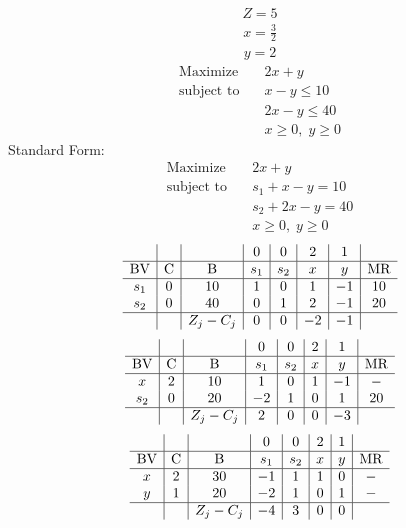 \documentclass{article}
\begin{document}
\begin{align*}
Z=5\end{align*}
\begin{align*}
x=\frac{3}{2}\end{align*}
\begin{align*}
y=2\end{align*}
\begin{align*}
\text{Maximize} \quad & 2x + y\\
\text{subject to} \quad
& x - y\le10\\
& 2x - y\le40\\
& x\ge0,\; y\ge0\end{align*}
Standard Form:\\
\begin{align*}
\text{Maximize} \quad & 2x + y\\
\text{subject to} \quad
& s_{1} + x - y=10\\
& s_{2} + 2x - y=40\\
& x\ge0,\; y\ge0\end{align*}
\begin{align*}
\begin{array}{c|c|c|c|c|c|c|c}
 &  &  & 0 & 0 & 2 & 1 & \\
\hline
\text{BV} & \text{C} & \text{B} & s_{1} & s_{2} & x & y & \text{MR} \\
\hline
s_{1} & 0 & 10 & 1 & 0 & 1 & -1 & 10 \\
s_{2} & 0 & 40 & 0 & 1 & 2 & -1 & 20 \\
\hline
 &  & Z_j-C_j & 0 & 0 & -2 & -1 & \\
\end{array}
\end{align*}
\begin{align*}
\begin{array}{c|c|c|c|c|c|c|c}
 &  &  & 0 & 0 & 2 & 1 & \\
\hline
\text{BV} & \text{C} & \text{B} & s_{1} & s_{2} & x & y & \text{MR} \\
\hline
x & 2 & 10 & 1 & 0 & 1 & -1 & - \\
s_{2} & 0 & 20 & -2 & 1 & 0 & 1 & 20 \\
\hline
 &  & Z_j-C_j & 2 & 0 & 0 & -3 & \\
\end{array}
\end{align*}
\begin{align*}
\begin{array}{c|c|c|c|c|c|c|c}
 &  &  & 0 & 0 & 2 & 1 & \\
\hline
\text{BV} & \text{C} & \text{B} & s_{1} & s_{2} & x & y & \text{MR} \\
\hline
x & 2 & 30 & -1 & 1 & 1 & 0 & - \\
y & 1 & 20 & -2 & 1 & 0 & 1 & - \\
\hline
 &  & Z_j-C_j & -4 & 3 & 0 & 0 & \\
\end{array}
\end{align*}
\end{document}
